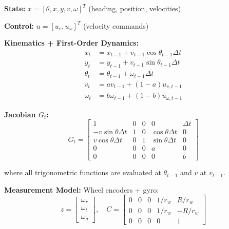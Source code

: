 \begin{tcolorbox}[colback=blue!5!white,colframe=blue!75!black,title=Differential Drive Robot]

\textbf{State:} $x = [\theta, x, y, v, \omega]^T$ (heading, position, velocities)

\textbf{Control:} $u = [u_v, u_\omega]^T$ (velocity commands)

\textbf{Kinematics + First-Order Dynamics:}
\begin{align}
x_t &= x_{t-1} + v_{t-1}\cos\theta_{t-1} \Delta t \\
y_t &= y_{t-1} + v_{t-1}\sin\theta_{t-1} \Delta t \\
\theta_t &= \theta_{t-1} + \omega_{t-1} \Delta t \\
v_t &= av_{t-1} + (1-a)u_{v,t-1} \\
\omega_t &= b\omega_{t-1} + (1-b)u_{\omega,t-1}
\end{align}

\textbf{Jacobian $G_t$:}
\begin{equation}
G_t = \begin{bmatrix}
1 & 0 & 0 & 0 & \Delta t \\
-v\sin\theta \Delta t & 1 & 0 & \cos\theta \Delta t & 0 \\
v\cos\theta \Delta t & 0 & 1 & \sin\theta \Delta t & 0 \\
0 & 0 & 0 & a & 0 \\
0 & 0 & 0 & 0 & b
\end{bmatrix}
\end{equation}

where all trigonometric functions are evaluated at $\theta_{t-1}$ and $v$ at $v_{t-1}$.

\textbf{Measurement Model:} Wheel encoders + gyro:
\begin{equation}
z = \begin{bmatrix} \omega_r \\ \omega_l \\ \omega_g \end{bmatrix}, \quad
C = \begin{bmatrix}
0 & 0 & 0 & 1/r_w & R/r_w \\
0 & 0 & 0 & 1/r_w & -R/r_w \\
0 & 0 & 0 & 0 & 1
\end{bmatrix}
\end{equation}

\end{tcolorbox}

